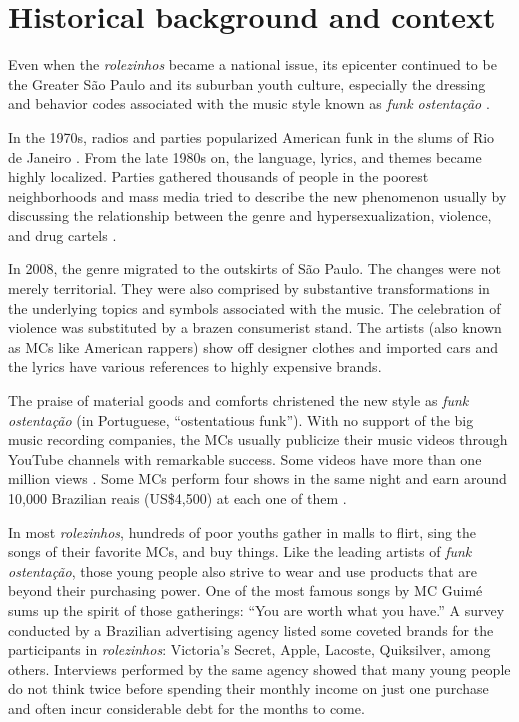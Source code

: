 \section{Historical background and context} \label{historical_background}

Even when the \emph{rolezinhos} became a national issue, its epicenter continued to be the Greater São Paulo and its suburban youth culture, especially the dressing and behavior codes associated with the music style known as \emph{funk ostentação} \autocite{epoca_origem_rolezinho}.

In the 1970s, radios and parties popularized American funk in the slums of Rio de Janeiro \autocite{cunha_2013_tapatrao}. From the late 1980s on, the language, lyrics, and themes became highly localized. Parties gathered thousands of people in the poorest neighborhoods and mass media tried to describe the new phenomenon usually by discussing the relationship between the genre and hypersexualization, violence, and drug cartels \autocite{cunha_2013_tapatrao}.

In 2008, the genre migrated to the outskirts of São Paulo. The changes were not merely territorial. They were also comprised by substantive transformations in the underlying topics and symbols associated with the music. The celebration of violence was substituted by a brazen consumerist stand. The artists (also known as MCs like American rappers) show off designer clothes and imported cars and the lyrics have various references to highly expensive brands.

The praise of material goods and comforts christened the new style as \emph{funk ostentação} (in Portuguese, \enquote{ostentatious funk}). With no support of the big music recording companies, the MCs usually publicize their music videos through YouTube channels with remarkable success. Some videos have more than one million views \autocite{youtube_daleste, youtube_guime, youtube_charmes}. Some MCs perform four shows in the same night and earn around 10,000 Brazilian reais (US\$4,500) at each one of them \autocite{epoca_salario_guime}.

In most \emph{rolezinhos}, hundreds of poor youths gather in malls to flirt, sing the songs of their favorite MCs, and buy things. Like the leading artists of \emph{funk ostentação}, those young people also strive to wear and use products that are beyond their purchasing power. One of the most famous songs by MC Guimé sums up the spirit of those gatherings: \enquote{You are worth what you have.} A survey \autocite{fbiz_rolezinho_consumo} conducted by a Brazilian advertising agency listed some coveted brands for the participants in \emph{rolezinhos}: Victoria's Secret, Apple, Lacoste, Quiksilver, among others. Interviews performed by the same agency showed that many young people do not think twice before spending their monthly income on just one purchase and often incur considerable debt for the months to come.

